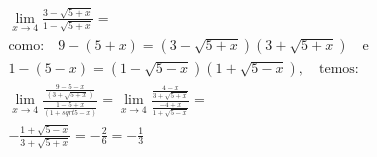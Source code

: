\begin{ex}
\begin{align}
&\lim_{x\rightarrow 4} \frac{3-\sqrt{5+x}}{1-\sqrt{5+x}}=\nonumber\\
&\text{como:}\quad 9-(5+x) = (3-\sqrt{5+x})(3+\sqrt{5+x})\quad \text{e}\nonumber\\
& 1-(5-x) =(1-\sqrt{5-x})(1+\sqrt{5-x}),\quad\text{temos:}\nonumber\\
&\lim_{x\rightarrow 4} \frac{\frac{9-5-x}{(3+\sqrt{5+x})}}{\frac{1-5+x}{(1+sqrt{5-x})}}=\lim_{x\rightarrow 4}\frac{\frac{4-x}{3+\sqrt{5+x}}}{\frac{-4+x}{1+\sqrt{5-x}}}=\nonumber\\
&-\frac{1+\sqrt{5-x}}{3+\sqrt{5+x}}=-\frac{2}{6}=-\frac{1}{3}\nonumber
\end{align}
\end{ex}
